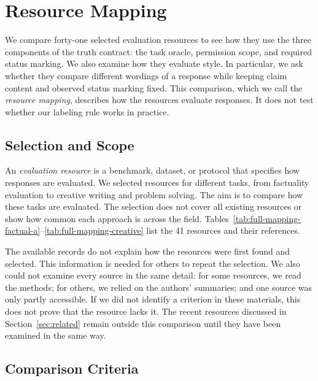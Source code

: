 \section{Resource Mapping}\label{sec:methodology}

We compare forty-one selected evaluation resources to see how they use the
three components of the truth contract: the task oracle, permission scope,
and required status marking. We also examine how they evaluate style.
In particular, we ask whether they compare different wordings of a response
while keeping claim content and observed status marking fixed. This
comparison, which we call the \emph{resource mapping}, describes how the
resources evaluate responses. It does not test whether our labeling rule
works in practice.

\subsection{Selection and Scope}

An \emph{evaluation resource} is a benchmark, dataset, or protocol that
specifies how responses are evaluated. We selected resources for different
tasks, from factuality evaluation to creative writing and problem solving.
The aim is to compare how these tasks are evaluated. The selection does not
cover all existing resources or show how common each approach is across
the field. Tables~\ref{tab:full-mapping-factual-a}--\ref{tab:full-mapping-creative}
list the 41 resources and their references.

The available records do not explain how the resources were first found
and selected. This information is needed for others to repeat the selection.
We also could not examine every source in the same detail: for some resources,
we read the methods; for others, we relied on the authors' summaries; and
one source was only partly accessible. If we did not identify a criterion
in these materials, this does not prove that the resource lacks it.
The recent resources discussed in Section~\ref{sec:related} remain outside
this comparison until they have been examined in the same way.

\subsection{Comparison Criteria}


